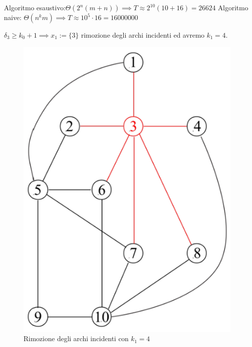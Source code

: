 \documentclass{article}
\begin{document}
\noindent Algoritmo esaustivo:$\Theta(2^n(m+n))\implies T\approx 2^{10}(10+16)=26624$
\newline
\noindent Algoritmo naive: $\Theta(n^km)\implies T\approx 10^5\cdot 16=16000000$

$\delta_3\geq k_0+1\implies x_1 := \{3\}$ rimozione degli archi incidenti ed avremo $k_1=4$.
\begin{figure}[H]
    \centering
    \includegraphics[scale=1]{images/kerneliz_1.png}
    \caption{Rimozione degli archi incidenti con $k_1=4$}
\end{figure}
\end{document}

